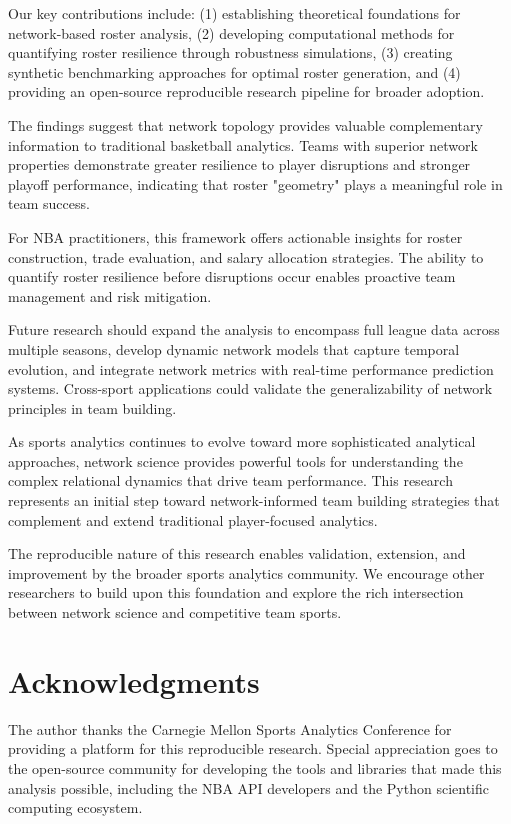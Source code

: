 \documentclass[11pt]{article}
\begin{document}
Our key contributions include: (1) establishing theoretical foundations for network-based roster analysis, (2) developing computational methods for quantifying roster resilience through robustness simulations, (3) creating synthetic benchmarking approaches for optimal roster generation, and (4) providing an open-source reproducible research pipeline for broader adoption.

The findings suggest that network topology provides valuable complementary information to traditional basketball analytics. Teams with superior network properties demonstrate greater resilience to player disruptions and stronger playoff performance, indicating that roster "geometry" plays a meaningful role in team success.

For NBA practitioners, this framework offers actionable insights for roster construction, trade evaluation, and salary allocation strategies. The ability to quantify roster resilience before disruptions occur enables proactive team management and risk mitigation.

Future research should expand the analysis to encompass full league data across multiple seasons, develop dynamic network models that capture temporal evolution, and integrate network metrics with real-time performance prediction systems. Cross-sport applications could validate the generalizability of network principles in team building.

As sports analytics continues to evolve toward more sophisticated analytical approaches, network science provides powerful tools for understanding the complex relational dynamics that drive team performance. This research represents an initial step toward network-informed team building strategies that complement and extend traditional player-focused analytics.

The reproducible nature of this research enables validation, extension, and improvement by the broader sports analytics community. We encourage other researchers to build upon this foundation and explore the rich intersection between network science and competitive team sports.

\section*{Acknowledgments}

The author thanks the Carnegie Mellon Sports Analytics Conference for providing a platform for this reproducible research. Special appreciation goes to the open-source community for developing the tools and libraries that made this analysis possible, including the NBA API developers and the Python scientific computing ecosystem.
\end{document}

